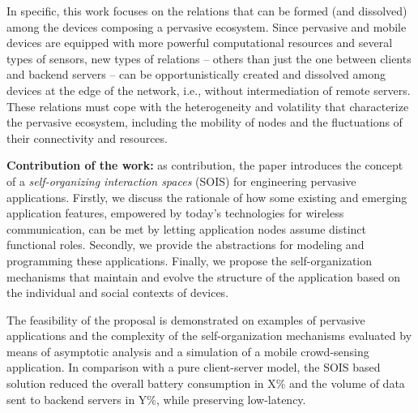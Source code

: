 


In specific, this work focuses on the relations that can be formed (and dissolved) among the devices composing a pervasive ecosystem. 
Since pervasive and mobile devices are equipped with more powerful computational resources and several types of sensors, 
new types of relations -- others than just the one between clients and backend servers -- can be opportunistically created and dissolved among devices at the edge of the network, i.e., without intermediation of remote servers. These relations must cope with the heterogeneity and volatility that characterize the pervasive ecosystem, including the mobility of nodes and the fluctuations of their connectivity and resources. 


\textbf{Contribution of the work:} 
as contribution, the paper introduces the concept of a \textit{self-organizing interaction spaces} (SOIS) 
for engineering pervasive applications. 
Firstly, we discuss the rationale of how some existing and emerging application features, empowered by today's technologies for wireless communication, 
can be met by letting application nodes assume distinct functional roles. 
Secondly, we provide the abstractions for modeling and programming these applications. Finally, we propose the self-organization mechanisms that maintain and evolve the structure of the application based on the individual and social contexts of devices.

The feasibility of the proposal is demonstrated on examples of pervasive applications and the complexity of the self-organization mechanisms evaluated by means of asymptotic analysis and a simulation of a mobile crowd-sensing application.
In comparison with a pure client-server model, the SOIS based solution reduced the overall battery consumption in X\% and the volume of data sent to backend servers in Y\%, while preserving low-latency.

